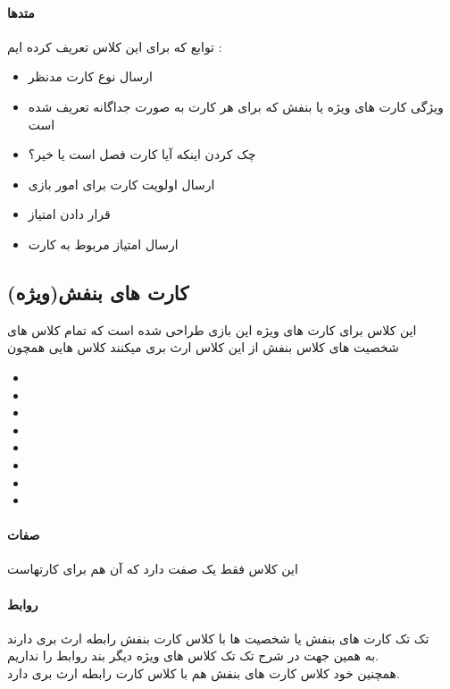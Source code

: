 \documentclass[pdf,titlepage,a4paper]{report}
\begin{document}
	\paragraph{متدها}
	توابع که برای این کلاس تعریف کرده ایم :

	\begin{itemize}
		\item {} ارسال نوع کارت مدنظر
		\item {} ویژگی کارت های ویژه یا بنفش که برای هر کارت به صورت جداگانه تعریف شده است
		\item {} چک کردن اینکه آیا کارت فصل است یا خیر؟
		\item {} ارسال اولویت کارت برای امور بازی 
		\item {}  قرار دادن امتیاز
		\item {} ارسال امتیاز مربوط به کارت
	\end{itemize}
	
	
	\subsection{کارت های بنفش(ویژه)}
	این کلاس برای کارت های ویژه این بازی طراحی شده است که تمام کلاس های شخصیت های کلاس بنفش از این کلاس ارث بری میکنند
	کلاس هایی همچون 
	\begin{itemize}
		\item {}
		\item {}
		\item {}
		\item {}
		\item {}
		\item {}
		\item {}
		\item {}  
	\end{itemize}
	\paragraph{صفات}
	این کلاس فقط یک صفت دارد که آن هم برای   کارتهاست
	\paragraph{روابط}
	تک تک کارت های بنفش یا شخصیت ها با کلاس کارت بنفش رابطه ارث بری دارند \\
	به همین جهت در شرح تک تک کلاس های ویژه دیگر بند روابط را نداریم.\\
	همچنین خود کلاس کارت های بنفش هم با کلاس کارت رابطه ارث بری دارد.\\
\end{document}
